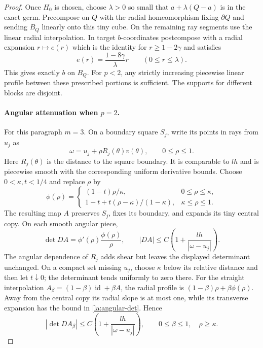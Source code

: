 \documentclass[11pt]{article}
\numberwithin{equation}{section}
\theoremstyle{definition}
\theoremstyle{remark}
\begin{document}
\begin{proof}
Once $H_0$ is chosen, choose $\lambda>0$ so small that $a+\lambda(Q-a)$ is in the exact
germ.  Precompose on $Q$ with the radial homeomorphism fixing
$\partial Q$ and sending $B_Q$ linearly onto this tiny cube.  On the
remaining ray segments use the linear radial interpolation.  In
target $b$-coordinates postcompose with a radial expansion $r\mapsto
e(r)$ which is the identity for $r\ge1-2\gamma$ and satisfies
\[
 e(r)=\frac{1-8\gamma}{\lambda}r\qquad(0\le r\le\lambda).
\]
This gives exactly $b$ on $B_Q$.  For $p<2$, any strictly increasing
piecewise linear profile between these prescribed portions is
sufficient.  The supports for different blocks are disjoint.

\paragraph{Angular attenuation when $p=2$.}
For this paragraph $m=3$.  On a boundary square $S_j$, write its
points in rays from $u_j$ as
\[
 \omega=u_j+\rho R_j(\theta)v(\theta),\qquad 0\le\rho\le1.
\]
Here $R_j(\theta)$ is the distance to the square boundary.  It is
comparable to $lh$ and is piecewise smooth with the corresponding
uniform derivative bounds.  Choose $0<\kappa,t<1/4$ and
replace $\rho$ by
\[
 \phi(\rho)=
 \begin{cases}
  (1-t)\rho/\kappa,&0\le\rho\le\kappa,\\
  1-t+t(\rho-\kappa)/(1-\kappa),&\kappa\le\rho\le1.
 \end{cases}
\]
The resulting map $A$ preserves $S_j$, fixes its boundary, and
expands its tiny central copy.  On each smooth angular piece,
\begin{equation}\label{la:angular-det}
 \det DA=\phi'(\rho)\frac{\phi(\rho)}{\rho},
 \qquad
 |DA|\le C\left(1+\frac{lh}{|\omega-u_j|}\right).
\end{equation}
The angular dependence of $R_j$ adds shear but leaves the displayed
determinant unchanged.  On a compact set missing $u_j$, choose
$\kappa$ below its relative distance and then let $t\downarrow0$;
the determinant tends uniformly to zero there.  For the straight
interpolation $A_\beta=(1-\beta)\operatorname{id}+\beta A$, the radial profile is
$(1-\beta)\rho+\beta\phi(\rho)$.  Away from the central copy its
radial slope is at most one, while its transverse expansion has the
bound in \eqref{la:angular-det}.  Hence
\begin{equation}\label{la:angular-interpolation}
 |\det DA_\beta|
 \le C\left(1+\frac{lh}{|\omega-u_j|}\right),
 \qquad0\le\beta\le1,\quad\rho\ge\kappa.
\end{equation}


\end{proof}
\end{document}
